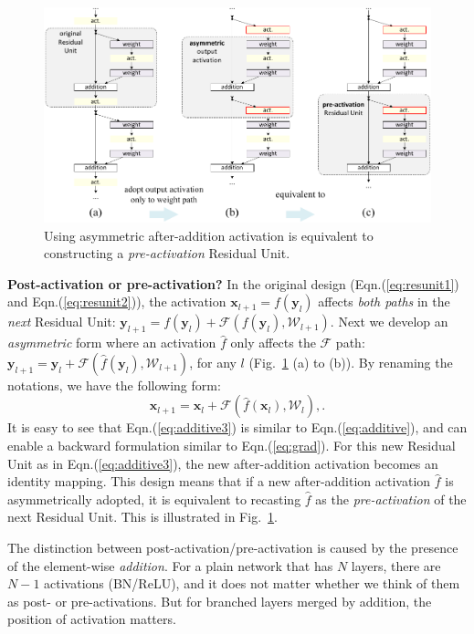 \documentclass[runningheads]{llncs}
\newcommand{\ve}[1]{\mathbf{#1}} %
\begin{document}
\begin{figure}[t]
\centering
\includegraphics[width=0.99\linewidth]{eps/asymmetric}
\caption{Using asymmetric after-addition activation is equivalent to constructing a \emph{pre-activation} Residual Unit.}
\label{fig:asymmetric}
\end{figure}

\textbf{Post-activation or pre-activation?}
In the original design (Eqn.(\ref{eq:resunit1}) and Eqn.(\ref{eq:resunit2})), the activation $\ve{x}_{l+1}=f(\ve{y}_{l})$ affects \emph{both paths} in the \emph{next} Residual Unit: $\ve{y}_{l+1} = f(\ve{y}_{l}) + \mathcal{F}(f(\ve{y}_{l}), \mathcal{W}_{l+1})$.
Next we develop an \emph{asymmetric} form where an activation $\hat{f}$ only affects the $\mathcal{F}$ path: $\ve{y}_{l+1} = \ve{y}_{l} + \mathcal{F}(\hat{f}(\ve{y}_{l}), \mathcal{W}_{l+1})$, for any $l$ (Fig.~\ref{fig:asymmetric} (a) to (b)). By renaming the notations, we have the following form:
\begin{equation}
\ve{x}_{l+1} = \ve{x}_{l} + \mathcal{F}(\hat{f}(\ve{x}_{l}), \mathcal{W}_{l}), \label{eq:additive3}.
\end{equation}
It is easy to see that Eqn.(\ref{eq:additive3}) is similar to Eqn.(\ref{eq:additive}), and can enable a backward formulation similar to Eqn.(\ref{eq:grad}). For this new Residual Unit as in Eqn.(\ref{eq:additive3}), the new after-addition activation becomes an identity mapping.
This design means that if a new after-addition activation $\hat{f}$ is asymmetrically adopted, it is equivalent to recasting $\hat{f}$ as the \emph{pre-activation} of the next Residual Unit. This is illustrated in Fig.~\ref{fig:asymmetric}.

The distinction between post-activation/pre-activation is caused by the presence of the element-wise \emph{addition}. For a plain network that has $N$ layers, there are $N-1$ activations (BN/ReLU), and it does not matter whether we think of them as post- or pre-activations. But for branched layers merged by addition, the position of activation matters.
\end{document}
